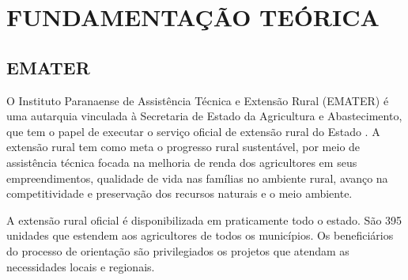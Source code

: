 
\chapter{FUNDAMENTAÇÃO TEÓRICA}
\label{chap:fundamentacao}

\section{EMATER}
\label{subsec:emater}

O Instituto Paranaense de Assistência Técnica e Extensão Rural (EMATER) é uma autarquia vinculada à Secretaria de Estado da Agricultura e Abastecimento, que tem o papel de executar o serviço oficial de extensão rural do Estado \cite{ematerAE}.
A extensão rural tem como meta o progresso rural sustentável, por meio de assistência técnica focada na melhoria de renda dos agricultores em seus empreendimentos, qualidade de vida nas famílias no ambiente rural, avanço na competitividade e preservação dos recursos naturais e o meio ambiente.

A extensão rural oficial é disponibilizada em praticamente todo o estado. São 395 unidades que estendem aos agricultores de todos os municípios. Os beneficiários do processo de orientação são privilegiados os projetos que atendam as necessidades locais e regionais.





